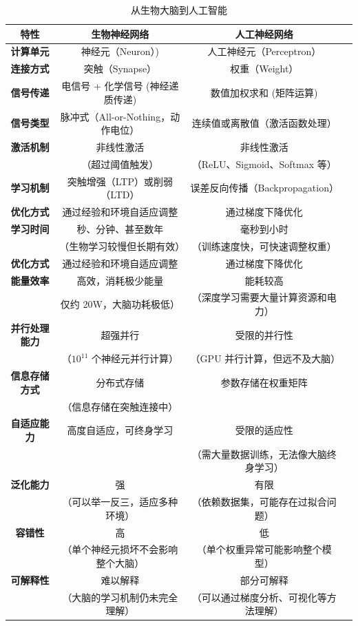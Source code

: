\begin{table}[htbp]
\centering
\caption{从生物大脑到人工智能}
\begin{tabular}{|c|c|c|c|}
\hline
{\bf 特性} & {\bf  生物神经网络 } & {\bf 人工神经网络}  \\
\hline
{\bf 计算单元} &  神经元（Neuron）)  &  人工神经元（Perceptron）   \\
\hline
{\bf 连接方式}  &  突触（Synapse）& 权重（Weight） \\
\hline
{\bf 信号传递 }  &  电信号 + 化学信号 (神经递质传递) &  数值加权求和 (矩阵运算)  \\
\hline
{\bf 信号类型 }  &  脉冲式（All-or-Nothing，动作电位） &  连续值或离散值（激活函数处理）\\
\hline
{\bf 激活机制 }  &  非线性激活 &  非线性激活\\
 &  （超过阈值触发） & （ReLU、Sigmoid、Softmax 等）\\
\hline
{\bf 学习机制}  &  突触增强（LTP）或削弱（LTD）  &  误差反向传播（Backpropagation）\\
\hline
{\bf 优化方式}  & 通过经验和环境自适应调整 & 通过梯度下降优化\\
\hline
{\bf 学习时间}  & 秒、分钟、甚至数年& 毫秒到小时\\
  & （生物学习较慢但长期有效）& （训练速度快，可快速调整权重）\\
\hline
{\bf 优化方式}  & 通过经验和环境自适应调整 & 通过梯度下降优化\\
\hline
{\bf 能量效率}  & 高效，消耗极少能量 & 能耗较高\\
& 仅约 20W，大脑功耗极低） & （深度学习需要大量计算资源和电力）\\
\hline
{\bf 并行处理能力}  & 超强并行& 受限的并行性\\
 & （$10^{11}$ 个神经元并行计算）& （GPU 并行计算，但远不及大脑）\\
\hline
{\bf 信息存储方式}  & 分布式存储 & 参数存储在权重矩阵\\
& （信息存储在突触连接中） & \\
\hline
{\bf 自适应能力}  & 高度自适应，可终身学习 &  受限的适应性 \\
 & &（需大量数据训练，无法像大脑终身学习）\\
\hline
{\bf 泛化能力}  &强 & 有限\\
  &（可以举一反三，适应多种环境） & （依赖数据集，可能存在过拟合问题）\\
\hline
{\bf 容错性}  &高  & 低\\
 &（单个神经元损坏不会影响整个大脑）  & （单个权重异常可能影响整个模型）\\
\hline
{\bf 可解释性}  & 难以解释 & 部分可解释\\
& （大脑的学习机制仍未完全理解） & （可以通过梯度分析、可视化等方法理解）\\
\hline
\end{tabular}
\label{从生物大脑到人工智能}
\end{table}

